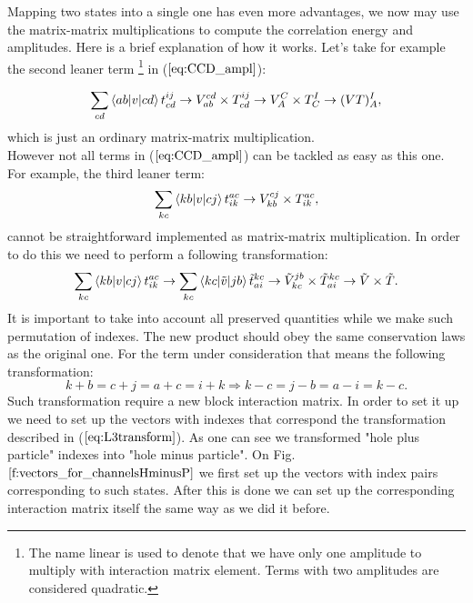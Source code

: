 \documentclass[twoside,english]{uiofysmaster}
\theoremstyle{definition}
\begin{document}
Mapping two states into a single one has even more advantages, we now may use the matrix-matrix multiplications to compute the correlation energy and amplitudes. Here is a brief explanation  of how it works. Let's take for example the second leaner term \footnote{The name linear is used to denote that we have only one amplitude to multiply with interaction matrix element. Terms with two amplitudes are considered quadratic.} in ($\ref{eq:CCD_ampl}$):

\begin{equation}
\sum_{cd}\braket{ab|v|cd}t_{cd}^{ij} \rightarrow V_{ab}^{cd} \times T_{cd}^{ij} \rightarrow V_{A}^{C} \times T_{C}^{I} \rightarrow (VT)_{A}^{I},
\end{equation}
which is just an ordinary matrix-matrix multiplication.\\
However not all terms in  ($\ref{eq:CCD_ampl}$) can be tackled as easy as this one. For example, the third leaner term:
\begin{align}
\sum_{kc}\braket{kb|v|cj}t_{ik}^{ac} \rightarrow V_{kb}^{cj} \times T_{ik}^{ac},
\end{align}
cannot be straightforward implemented as matrix-matrix multiplication. In order to do this we need to perform a following transformation:
\begin{align}
\sum_{kc}\braket{kb|v|cj}t_{ik}^{ac} \rightarrow \sum_{kc}\braket{kc|\tilde{v}|jb}\tilde{t}_{ai}^{kc} \rightarrow \tilde{V}_{kc}^{jb}\times \tilde{T}_{ai}^{kc} \rightarrow \tilde{V}\times\tilde{T}.
\end{align}
It is important to take into account all preserved quantities while we make such permutation of indexes. The new product should obey the same conservation laws as the original one. For the term under consideration that means the following transformation:
\begin{equation}\label{eq:L3transform}
k+b=c+j=a+c=i+k \Rightarrow k-c=j -b=a-i=k-c.
\end{equation}
Such transformation require a new block interaction matrix. In order to set it up we need to set up the vectors with indexes that correspond the transformation described in ($\ref{eq:L3transform}$). As one can see we transformed "hole plus particle" indexes into "hole minus particle". On Fig. $\ref{f:vectors_for_channelsHminusP}$ we first set up the vectors with index pairs corresponding to such states. After this is done we can set up the corresponding interaction matrix itself the same way as we did it before. 
\end{document}
